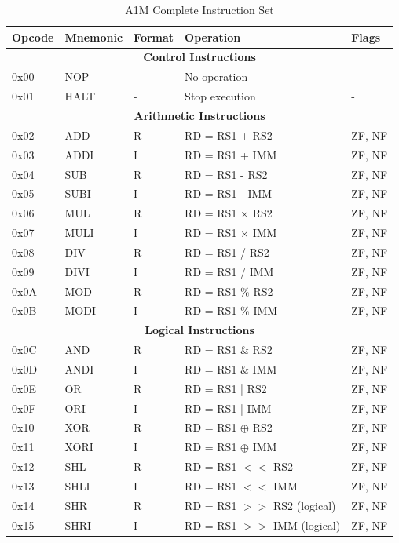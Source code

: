 \documentclass[12pt,a4paper,oneside]{book}
\begin{document}
\begin{table}[H]
\centering
\caption{A1M Complete Instruction Set}
\label{tab:complete-instructions}
\tiny
\begin{tabularx}{\textwidth}{|l|l|l|X|l|}
\hline
\textbf{Opcode} & \textbf{Mnemonic} & \textbf{Format} & \textbf{Operation} & \textbf{Flags} \\
\hline
\multicolumn{5}{|c|}{\textbf{Control Instructions}} \\
\hline
0x00 & NOP & - & No operation & - \\
0x01 & HALT & - & Stop execution & - \\
\hline
\multicolumn{5}{|c|}{\textbf{Arithmetic Instructions}} \\
\hline
0x02 & ADD & R & RD = RS1 + RS2 & ZF, NF \\
0x03 & ADDI & I & RD = RS1 + IMM & ZF, NF \\
0x04 & SUB & R & RD = RS1 - RS2 & ZF, NF \\
0x05 & SUBI & I & RD = RS1 - IMM & ZF, NF \\
0x06 & MUL & R & RD = RS1 $\times$ RS2 & ZF, NF \\
0x07 & MULI & I & RD = RS1 $\times$ IMM & ZF, NF \\
0x08 & DIV & R & RD = RS1 / RS2 & ZF, NF \\
0x09 & DIVI & I & RD = RS1 / IMM & ZF, NF \\
0x0A & MOD & R & RD = RS1 \% RS2 & ZF, NF \\
0x0B & MODI & I & RD = RS1 \% IMM & ZF, NF \\
\hline
\multicolumn{5}{|c|}{\textbf{Logical Instructions}} \\
\hline
0x0C & AND & R & RD = RS1 \& RS2 & ZF, NF \\
0x0D & ANDI & I & RD = RS1 \& IMM & ZF, NF \\
0x0E & OR & R & RD = RS1 | RS2 & ZF, NF \\
0x0F & ORI & I & RD = RS1 | IMM & ZF, NF \\
0x10 & XOR & R & RD = RS1 $\oplus$ RS2 & ZF, NF \\
0x11 & XORI & I & RD = RS1 $\oplus$ IMM & ZF, NF \\
0x12 & SHL & R & RD = RS1 $<<$ RS2 & ZF, NF \\
0x13 & SHLI & I & RD = RS1 $<<$ IMM & ZF, NF \\
0x14 & SHR & R & RD = RS1 $>>$ RS2 (logical) & ZF, NF \\
0x15 & SHRI & I & RD = RS1 $>>$ IMM (logical) & ZF, NF \\

\end{tabularx}
\end{table}
\end{document}
